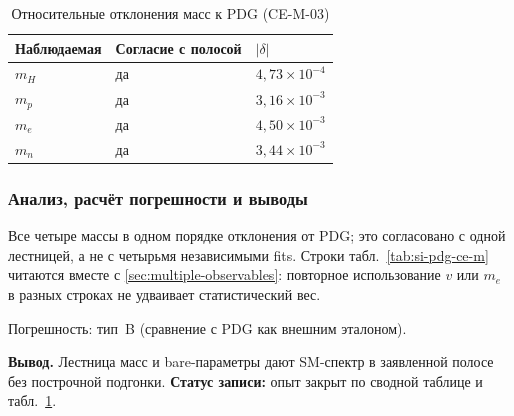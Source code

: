 \begin{table}[htbp]
\centering
\small
\caption{Относительные отклонения масс к PDG (CE-M-03)}
\label{tab:exp-ce-m-03-checks}
\begin{tabular}{@{}lll@{}}
\toprule
Наблюдаемая & Согласие с полосой & $|\delta|$ \\
\midrule
$m_H$ & да & $4{,}73\times 10^{-4}$ \\
$m_p$ & да & $3{,}16\times 10^{-3}$ \\
$m_e$ & да & $4{,}50\times 10^{-3}$ \\
$m_n$ & да & $3{,}44\times 10^{-3}$ \\
\bottomrule
\end{tabular}
\end{table}

\subsubsection*{Анализ, расчёт погрешности и выводы}
Все четыре массы в одном порядке отклонения от PDG; это согласовано с одной лестницей, а не с четырьмя независимыми fits.
Строки табл.~\ref{tab:si-pdg-ce-m} читаются вместе с \cref{sec:multiple-observables}: повторное использование $v$ или $m_e$ в разных строках не удваивает статистический вес.

Погрешность: тип~B (сравнение с PDG как внешним эталоном).

\textbf{Вывод.}
Лестница масс и bare-параметры дают SM-спектр в заявленной полосе без построчной подгонки.
\textbf{Статус записи:} опыт закрыт по сводной таблице и табл.~\ref{tab:exp-ce-m-03-checks}.
